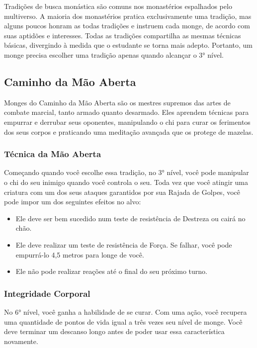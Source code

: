 \begin{multicols}{2}
Tradições de busca monástica são comuns nos monastérios espalhados pelo
multiverso. A maioria dos monastérios pratica exclusivamente uma tradição, mas
alguns poucos honram as todas tradições e instruem cada monge, de acordo com
suas aptidões e interesses. Todas as tradições compartilha as mesmas técnicas
básicas, divergindo à medida que o estudante se torna mais adepto. Portanto, um
monge precisa escolher uma tradição apenas quando alcançar o 3° nível.

\subsection*{Caminho da Mão Aberta}%
\label{sub:caminho_da_mao_aberta}

Monges do Caminho da Mão Aberta são os mestres supremos das artes de combate
marcial, tanto armado quanto desarmado. Eles aprendem técnicas para empurrar e
derrubar seus oponentes, manipulando o chi para curar os ferimentos dos seus
corpos e praticando uma meditação avançada que os protege de mazelas.

\subsubsection*{Técnica da Mão Aberta}%
\label{ssub:tecnica_da_mao_aberta}

Começando quando você escolhe essa tradição, no 3° nível, você pode manipular o
chi do seu inimigo quando você controla o seu. Toda vez que você atingir uma
criatura com um dos seus ataques garantidos por sua Rajada de Golpes, você pode
impor um dos seguintes efeitos no alvo:

\begin{itemize}
    \item Ele deve ser bem sucedido num teste de resistência de Destreza ou
        cairá no chão.
    \item Ele deve realizar um teste de resistência de Força. Se falhar, você
        pode empurrá-lo 4,5 metros para longe de você.
    \item Ele não pode realizar reações até o final do seu próximo turno.
\end{itemize}

\subsubsection*{Integridade Corporal}%
\label{ssub:integridade_corporal}

No 6° nível, você ganha a habilidade de se curar. Com uma ação, você recupera
uma quantidade de pontos de vida igual a três vezes seu nível de monge. Você
deve terminar um descanso longo antes de poder usar essa característica
novamente.


\end{multicols}
